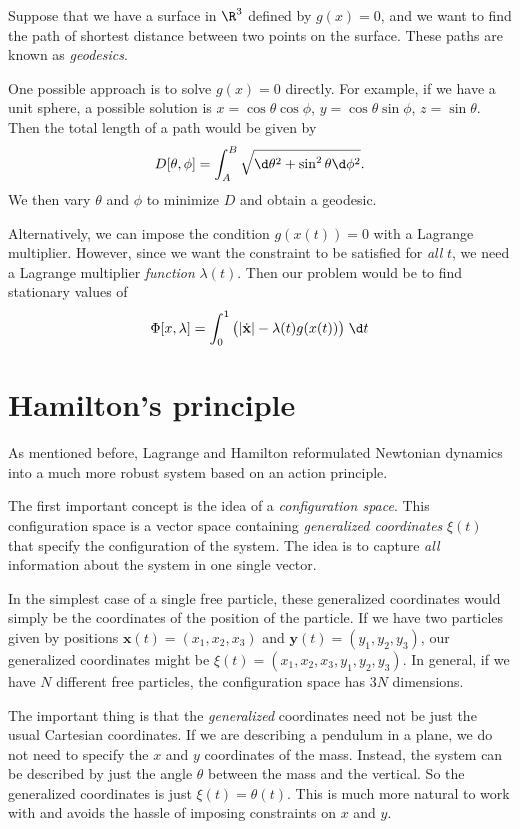 \documentclass[a4paper]{article}
\begin{document}
\begin{eg}[Geodesics]
  Suppose that we have a surface in $\R^3$ defined by $g(x) = 0$, and we want to find the path of shortest distance between two points on the surface. These paths are known as \emph{geodesics}.

  One possible approach is to solve $g(x) = 0$ directly. For example, if we have a unit sphere, a possible solution is $x = \cos\theta \cos\phi$, $y = \cos\theta\sin\phi$, $z = \sin\theta$. Then the total length of a path would be given by
  \[
    D[\theta, \phi] = \int_A^B \sqrt{\d \theta^2 + \sin^2 \theta \d \phi^2}.
  \]
  We then vary $\theta$ and $\phi$ to minimize $D$ and obtain a geodesic.

  Alternatively, we can impose the condition $g(x(t)) = 0$ with a Lagrange multiplier. However, since we want the constraint to be satisfied for \emph{all} $t$, we need a Lagrange multiplier \emph{function} $\lambda(t)$. Then our problem would be to find stationary values of
  \[
    \Phi[x, \lambda] = \int_0^1 \big(|\dot{\mathbf{x}}| - \lambda(t) g(x(t))\big)\;\d t
  \]
\end{eg}
\section{Hamilton's principle}
\label{sec:hamilton}
As mentioned before, Lagrange and Hamilton reformulated Newtonian dynamics into a much more robust system based on an action principle.

The first important concept is the idea of a \emph{configuration space}. This configuration space is a vector space containing \emph{generalized coordinates} $\xi(t)$ that specify the configuration of the system. The idea is to capture \emph{all} information about the system in one single vector.

In the simplest case of a single free particle, these generalized coordinates would simply be the coordinates of the position of the particle. If we have two particles given by positions $\mathbf{x}(t) = (x_1, x_2, x_3)$ and $\mathbf{y}(t) = (y_1, y_2, y_3)$, our generalized coordinates might be $\xi(t) = (x_1, x_2, x_3, y_1, y_2, y_3)$. In general, if we have $N$ different free particles, the configuration space has $3N$ dimensions.

The important thing is that the \emph{generalized} coordinates need not be just the usual Cartesian coordinates. If we are describing a pendulum in a plane, we do not need to specify the $x$ and $y$ coordinates of the mass. Instead, the system can be described by just the angle $\theta$ between the mass and the vertical. So the generalized coordinates is just $\xi(t) = \theta(t)$. This is much more natural to work with and avoids the hassle of imposing constraints on $x$ and $y$.
\end{document}
